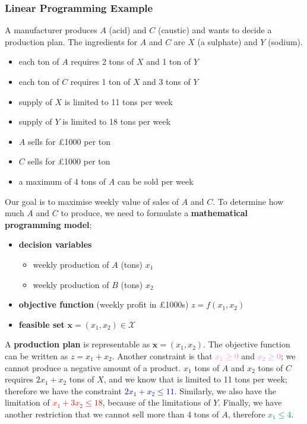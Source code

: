 \documentclass[a4paper, 12pt]{article}
\renewcommand{\vec}[1]{\boldsymbol{#1}}
\newcommand{\violet}[1]{\textcolor{violet}{#1}}
\newcommand{\blue}[1]{\textcolor{blue}{#1}}
\newcommand{\red}[1]{\textcolor{red}{#1}}
\newcommand{\teal}[1]{\textcolor{teal}{#1}}
\begin{document}
            \subsubsection*{Linear Programming Example}
                A manufacturer produces $A$ (acid) and $C$ (caustic) and wants to decide a production plan.
                The ingredients for $A$ and $C$ are $X$ (a sulphate) and $Y$ (sodium).
                \begin{itemize}
                    \itemsep0em
                    \item each ton of $A$ requires 2 tons of $X$ and 1 ton of $Y$
                    \item each ton of $C$ requires 1 ton of $X$ and 3 tons of $Y$
                    \item supply of $X$ is limited to 11 tons per week
                    \item supply of $Y$ is limited to 18 tons per week
                    \item $A$ sells for £1000 per ton
                    \item $C$ sells for £1000 per ton
                    \item a maximum of 4 tons of $A$ can be sold per week
                \end{itemize}
                Our goal is to maximise weekly value of sales of $A$ and $C$.
                To determine how much $A$ and $C$ to produce, we need to formulate a \textbf{mathematical programming model};
                \begin{itemize}
                    \itemsep0em
                    \item \textbf{decision variables}
                        \begin{itemize}
                            \itemsep0em
                            \item weekly production of $A$ (tons) \hfill $x_1$
                            \item weekly production of $B$ (tons) \hfill $x_2$
                        \end{itemize}
                    \item \textbf{objective function} (weekly profit in £1000s) \hfill $z = f(x_1, x_2)$
                    \item \textbf{feasible set} \hfill $\vec{x} = (x_1, x_2) \in \mathcal{X}$
                \end{itemize}
                A \textbf{production plan} is representable as $\vec{x} = (x_1, x_2)$.
                The objective function can be written as $z = x_1 + x_2$.
                Another constraint is that \violet{$x_1 \geq 0$} and \violet{$x_2 \geq 0$}; we cannot produce a negative amount of a product.
                $x_1$ tons of $A$ and $x_2$ tons of $C$ requires $2x_1 + x_2$ tons of $X$, and we know that is limited to 11 tons per week; therefore we have the constraint \blue{$2x_1 + x_2 \leq 11$}.
                Similarly, we also have the limitation of \red{$x_1 + 3x_2 \leq 18$}, because of the limitations of $Y$.
                Finally, we have another restriction that we cannot sell more than 4 tons of $A$, therefore \teal{$x_1 \leq 4$}.
                \medskip
\end{document}

